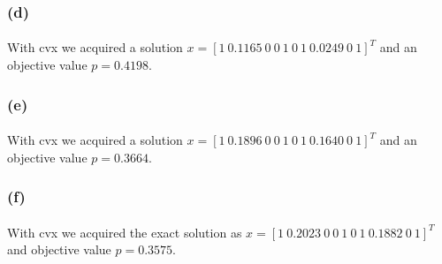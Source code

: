 \subsubsection*{(d)}
\paragraph{}
With cvx we acquired a solution $x=[1\ 0.1165\ 0\ 0\ 1\ 0\ 1\ 0.0249\ 0\ 1]^T$ and an objective value $p=0.4198$.
 
\subsubsection*{(e)}
\paragraph{}
With cvx we acquired a solution $x=[1\ 0.1896\ 0\ 0\ 1\ 0\ 1\ 0.1640\ 0\ 1]^T$ and an objective value $p=0.3664$.
\subsubsection*{(f)}
\paragraph{}
With cvx we acquired the exact solution as $x=[1\ 0.2023\ 0\ 0\ 1\ 0\ 1\ 0.1882\ 0\ 1]^T$ and objective value $p=0.3575$. 
